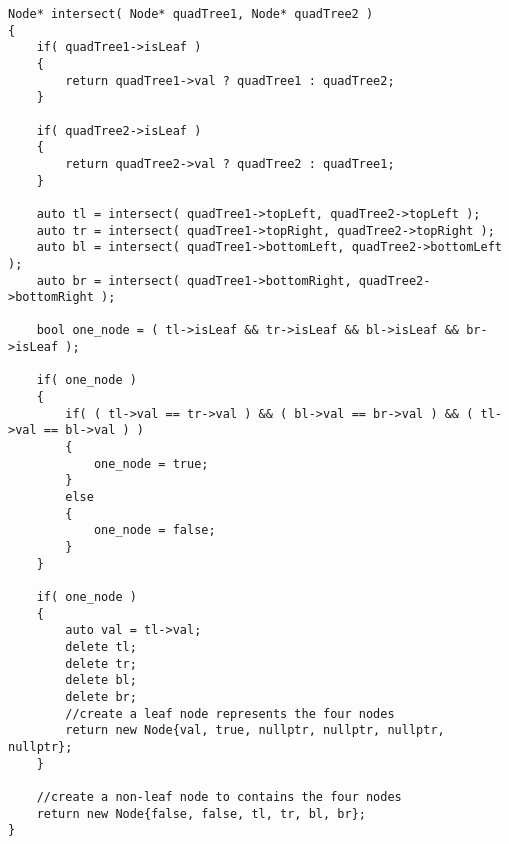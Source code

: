 \setcounter{lstlisting}{0}
\begin{lstlisting}[style=customc, caption={DFS}]
Node* intersect( Node* quadTree1, Node* quadTree2 )
{
    if( quadTree1->isLeaf )
    {
        return quadTree1->val ? quadTree1 : quadTree2;
    }

    if( quadTree2->isLeaf )
    {
        return quadTree2->val ? quadTree2 : quadTree1;
    }

    auto tl = intersect( quadTree1->topLeft, quadTree2->topLeft );
    auto tr = intersect( quadTree1->topRight, quadTree2->topRight );
    auto bl = intersect( quadTree1->bottomLeft, quadTree2->bottomLeft );
    auto br = intersect( quadTree1->bottomRight, quadTree2->bottomRight );

    bool one_node = ( tl->isLeaf && tr->isLeaf && bl->isLeaf && br->isLeaf );

    if( one_node )
    {
        if( ( tl->val == tr->val ) && ( bl->val == br->val ) && ( tl->val == bl->val ) )
        {
            one_node = true;
        }
        else
        {
            one_node = false;
        }
    }

    if( one_node )
    {
        auto val = tl->val;
        delete tl;
        delete tr;
        delete bl;
        delete br;
        //create a leaf node represents the four nodes
        return new Node{val, true, nullptr, nullptr, nullptr, nullptr};
    }

    //create a non-leaf node to contains the four nodes
    return new Node{false, false, tl, tr, bl, br};
}
\end{lstlisting}
